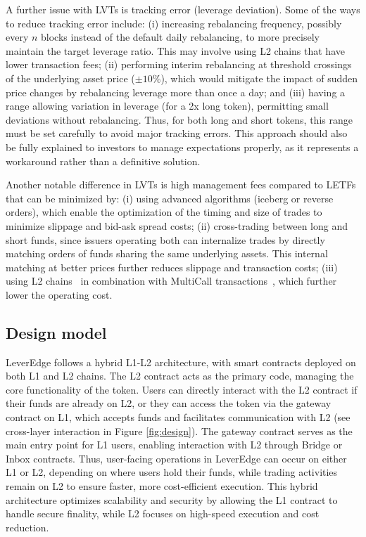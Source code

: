 A further issue with LVTs is tracking error (leverage deviation). Some of the ways to reduce tracking error include: (i) increasing rebalancing frequency, possibly every \(n\) blocks instead of the default daily rebalancing, to more precisely maintain the target leverage ratio. This may involve using L2 chains that have lower transaction fees; (ii) performing interim rebalancing at threshold crossings of the underlying asset price (\eg \(\pm10\%\)), which would mitigate the impact of sudden price changes by rebalancing leverage more than once a day; and (iii) having a range allowing variation in leverage (\eg [1.95x, 2.05x] for a 2x long token), permitting small deviations without rebalancing. Thus, for both long and short tokens, this range must be set carefully to avoid major tracking errors. This approach should also be fully explained to investors to manage expectations properly, as it represents a workaround rather than a definitive solution.

Another notable difference in LVTs is high management fees compared to LETFs that can be minimized by: (i) using advanced algorithms (iceberg or reverse orders), which enable the optimization of the timing and size of trades to minimize slippage and bid-ask spread costs; (ii) cross-trading between long and short funds, since issuers operating both can internalize trades by directly matching orders of funds sharing the same underlying assets. This internal matching at better prices further reduces slippage and transaction costs; (iii) using L2 chains~\cite{Gangwal_2022} in combination with MultiCall transactions~\cite{hughes2021multicall}, which further lower the operating cost.

\subsection{Design model}
LeverEdge follows a hybrid L1-L2 architecture, with smart contracts deployed on both L1 and L2 chains. The L2 contract acts as the primary code, managing the core functionality of the token. Users can directly interact with the L2 contract if their funds are already on L2, or they can access the token via the gateway contract on L1, which accepts funds and facilitates communication with L2 (see cross-layer interaction in Figure \ref{fig:design}). The gateway contract serves as the main entry point for L1 users, enabling interaction with L2 through Bridge or Inbox contracts. Thus, user-facing operations in LeverEdge can occur on either L1 or L2, depending on where users hold their funds, while trading activities remain on L2 to ensure faster, more cost-efficient execution. This hybrid architecture optimizes scalability and security by allowing the L1 contract to handle secure finality, while L2 focuses on high-speed execution and cost reduction.

